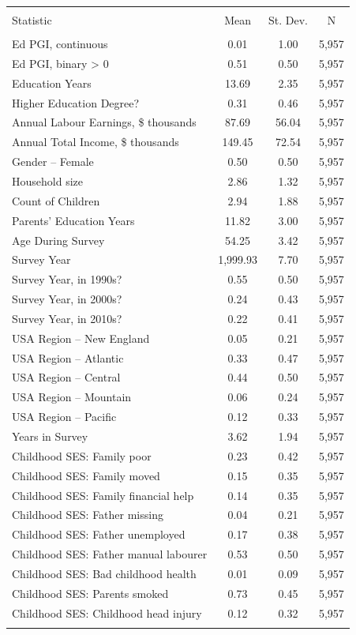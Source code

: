 
\begin{tabular}{@{\extracolsep{5pt}}lccc} 
\\[-1.8ex]\hline 
\hline \\[-1.8ex] 
Statistic & \multicolumn{1}{c}{Mean} & \multicolumn{1}{c}{St. Dev.} & \multicolumn{1}{c}{N} \\ 
\hline \\[-1.8ex] 
Ed PGI, continuous & 0.01 & 1.00 & 5,957 \\ 
Ed PGI, binary > 0 & 0.51 & 0.50 & 5,957 \\ 
Education Years & 13.69 & 2.35 & 5,957 \\ 
Higher Education Degree? & 0.31 & 0.46 & 5,957 \\ 
Annual Labour Earnings, \$ thousands & 87.69 & 56.04 & 5,957 \\ 
Annual Total Income, \$ thousands & 149.45 & 72.54 & 5,957 \\ 
Gender -- Female & 0.50 & 0.50 & 5,957 \\ 
Household size & 2.86 & 1.32 & 5,957 \\ 
Count of Children & 2.94 & 1.88 & 5,957 \\ 
Parents' Education Years & 11.82 & 3.00 & 5,957 \\ 
Age During Survey & 54.25 & 3.42 & 5,957 \\ 
Survey Year & 1,999.93 & 7.70 & 5,957 \\ 
Survey Year, in 1990s? & 0.55 & 0.50 & 5,957 \\ 
Survey Year, in 2000s? & 0.24 & 0.43 & 5,957 \\ 
Survey Year, in 2010s? & 0.22 & 0.41 & 5,957 \\ 
USA Region -- New England & 0.05 & 0.21 & 5,957 \\ 
USA Region -- Atlantic & 0.33 & 0.47 & 5,957 \\ 
USA Region -- Central & 0.44 & 0.50 & 5,957 \\ 
USA Region -- Mountain & 0.06 & 0.24 & 5,957 \\ 
USA Region -- Pacific & 0.12 & 0.33 & 5,957 \\ 
Years in Survey & 3.62 & 1.94 & 5,957 \\ 
Childhood SES: Family poor & 0.23 & 0.42 & 5,957 \\ 
Childhood SES: Family moved & 0.15 & 0.35 & 5,957 \\ 
Childhood SES: Family financial help & 0.14 & 0.35 & 5,957 \\ 
Childhood SES: Father missing & 0.04 & 0.21 & 5,957 \\ 
Childhood SES: Father unemployed & 0.17 & 0.38 & 5,957 \\ 
Childhood SES: Father manual labourer & 0.53 & 0.50 & 5,957 \\ 
Childhood SES: Bad childhood health & 0.01 & 0.09 & 5,957 \\ 
Childhood SES: Parents smoked & 0.73 & 0.45 & 5,957 \\ 
Childhood SES: Childhood head injury & 0.12 & 0.32 & 5,957 \\ 
\hline \\[-1.8ex] 
\end{tabular} 

